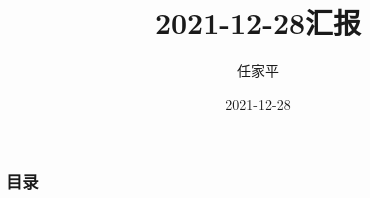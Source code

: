 \documentclass[12pt, utf-8]{beamer}
\title{2021-12-28汇报}
\author{任家平}
\institute{同济大学测绘与地理信息学院}
\date{2021-12-28}
\begin{document}
\begin{frame}
    \titlepage
\end{frame}

\begin{frame}
    \frametitle{目录}
    \tableofcontents
\end{frame}






%     

% 
\end{document}

